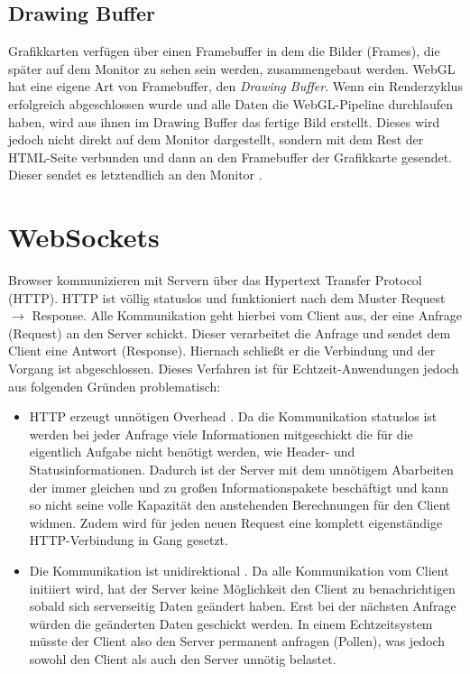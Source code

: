 \subsection{Drawing Buffer}
Grafikkarten verfügen über einen Framebuffer in dem die Bilder (Frames), die später auf dem Monitor zu sehen sein werden, zusammengebaut werden. WebGL hat eine eigene Art von Framebuffer, den \textit{Drawing Buffer}. Wenn ein Renderzyklus erfolgreich abgeschlossen wurde und alle Daten die WebGL-Pipeline durchlaufen haben, wird aus ihnen im Drawing Buffer das fertige Bild erstellt. Dieses wird jedoch nicht direkt auf dem Monitor dargestellt, sondern mit dem Rest der HTML-Seite verbunden und dann an den Framebuffer der Grafikkarte gesendet. Dieser sendet es letztendlich an den Monitor \autocite[5--7]{WebGlPogramming}.

\section{WebSockets}
\label{sec:websockets}
Browser kommunizieren mit Servern über das Hypertext Transfer Protocol (HTTP). HTTP ist völlig statuslos und funktioniert nach dem Muster Request $\rightarrow$ Response. Alle Kommunikation geht hierbei vom Client aus, der eine Anfrage (Request) an den Server schickt. Dieser verarbeitet die Anfrage und sendet dem Client eine Antwort (Response). Hiernach schließt er die Verbindung und der Vorgang ist abgeschlossen. Dieses Verfahren ist für Echtzeit-Anwendungen jedoch aus folgenden Gründen problematisch:
\begin{itemize}
    \item HTTP erzeugt unnötigen Overhead \autocite[673]{WebsocketsFurukawa}. Da die Kommunikation statuslos ist werden bei jeder Anfrage viele Informationen mitgeschickt die für die eigentlich Aufgabe nicht benötigt werden, wie Header- und Statusinformationen. Dadurch ist der Server mit dem unnötigem Abarbeiten der immer gleichen und zu großen Informationspakete beschäftigt und kann so nicht seine volle Kapazität den anstehenden Berechnungen für den Client widmen. Zudem wird für jeden neuen Request eine komplett eigenständige HTTP-Verbindung in Gang gesetzt.
    \item Die Kommunikation ist unidirektional \autocite{WebsocketsRichter}. Da alle Kommunikation vom Client initiiert wird, hat der Server keine Möglichkeit den Client zu benachrichtigen sobald sich serverseitig Daten geändert haben. Erst bei der nächsten Anfrage würden die geänderten Daten geschickt werden. In einem Echtzeitsystem müsste der Client also den Server permanent anfragen (Pollen), was jedoch sowohl den Client als auch den Server unnötig belastet.
\end{itemize}
